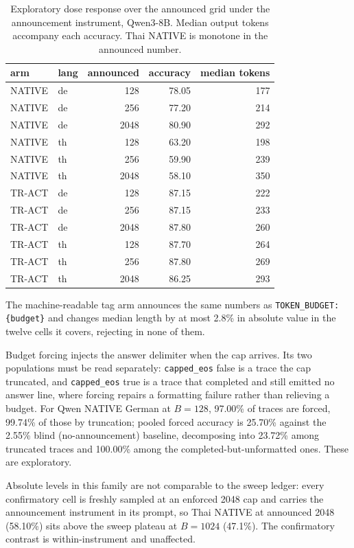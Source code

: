 \documentclass[11pt]{article}
\begin{document}
\begin{table}[t]
\centering
\small
\caption{Exploratory dose response over the announced grid under the
announcement instrument, Qwen3-8B. Median output tokens accompany each
accuracy. Thai NATIVE is monotone in the announced number.}
\label{tab:e2-dose}
\begin{tabular}{llrrr}
\toprule
arm & lang & announced & accuracy & median tokens \\
\midrule
NATIVE & de & 128  & 78.05 & 177 \\
NATIVE & de & 256  & 77.20 & 214 \\
NATIVE & de & 2048 & 80.90 & 292 \\
\midrule
NATIVE & th & 128  & 63.20 & 198 \\
NATIVE & th & 256  & 59.90 & 239 \\
NATIVE & th & 2048 & 58.10 & 350 \\
\midrule
TR-ACT & de & 128  & 87.15 & 222 \\
TR-ACT & de & 256  & 87.15 & 233 \\
TR-ACT & de & 2048 & 87.80 & 260 \\
\midrule
TR-ACT & th & 128  & 87.70 & 264 \\
TR-ACT & th & 256  & 87.80 & 269 \\
TR-ACT & th & 2048 & 86.25 & 293 \\
\bottomrule
\end{tabular}
\end{table}

The machine-readable tag arm announces the same numbers as
\texttt{TOKEN\_BUDGET: \{budget\}} and changes median length by at most 2.8\% in absolute value in the
twelve cells it covers, rejecting in none of them.

Budget forcing injects the answer delimiter when the cap arrives. Its two
populations must be read separately: \texttt{capped\_eos} false is a trace the
cap truncated, and \texttt{capped\_eos} true is a trace that completed and
still emitted no answer line, where forcing repairs a formatting failure rather
than relieving a budget. For Qwen NATIVE German at \(B=128\), 97.00\% of traces
are forced, 99.74\% of those by truncation; pooled forced accuracy is 25.70\%
against the 2.55\% blind (no-announcement) baseline, decomposing into 23.72\%
among truncated traces and
100.00\% among the completed-but-unformatted ones. These are exploratory.

Absolute levels in this family are not comparable to the sweep ledger: every
confirmatory cell is freshly sampled at an enforced 2048 cap and carries the
announcement instrument in its prompt, so Thai NATIVE at announced 2048
(58.10\%) sits above the sweep plateau at \(B=1024\) (47.1\%). The
confirmatory contrast is within-instrument and unaffected.
\end{document}
